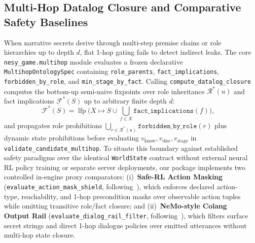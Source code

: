 \subsection{Multi-Hop Datalog Closure and Comparative Safety Baselines}\label{sec:multihop-baselines}
When narrative secrets derive through multi-step premise chains or role hierarchies up to depth $d$, flat 1-hop gating fails to detect indirect leaks. The core \texttt{nesy\_\allowbreak game.\allowbreak multihop} module evaluates a frozen declarative \texttt{MultihopOntologySpec} containing \texttt{role\_parents}, \texttt{fact\_implications}, \texttt{forbidden\_by\_role}, and \texttt{min\_stage\_by\_fact}. Calling \texttt{compute\_datalog\_closure} computes the bottom-up semi-naive fixpoints over role inheritance $\mathcal{R}^*(u)$ and fact implications $\mathcal{F}^*(S)$ up to arbitrary finite depth $d$:
\begin{equation}
\mathcal{F}^*(S)=\operatorname{lfp}\Big(X\mapsto S\cup\bigcup_{f\in X}\texttt{fact\_implications}(f)\Big),
\end{equation}
and propagates role prohibitions $\bigcup_{r\in\mathcal{R}^*(u)}\texttt{forbidden\_by\_role}(r)$ plus dynamic state prohibitions before evaluating $v_{\mathrm{know}}, v_{\mathrm{disc}}, v_{\mathrm{stage}}$ in \texttt{validate\_\allowbreak candidate\_\allowbreak multihop}. To situate this boundary against established safety paradigms over the identical \texttt{WorldState} contract without external neural RL policy training or separate server deployments, our package implements two controlled in-engine proxy comparators: (i)~\textbf{Safe-RL Action Masking} (\texttt{evaluate\_\allowbreak action\_\allowbreak mask\_\allowbreak shield}, following~\cite{alshiekh2018shield}), which enforces declared action-type, reachability, and 1-hop precondition masks over observable action tuples while omitting transitive role/fact closure; and (ii)~\textbf{NeMo-style Colang Output Rail} (\texttt{evaluate\_\allowbreak dialog\_\allowbreak rail\_\allowbreak filter}, following~\cite{rebedea2023nemo}), which filters surface secret strings and direct 1-hop dialogue policies over emitted utterances without multi-hop state closure.

